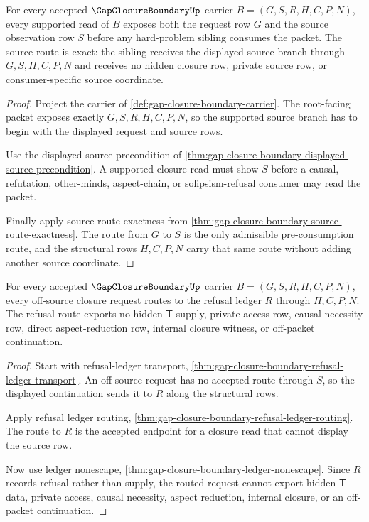 \begin{theorem}
\label{thm:gap-closure-boundary-source-observation-totality}
For every accepted $\GapClosureBoundaryUp$ carrier $B=(G,S,R,H,C,P,N)$, every supported read of $B$ exposes both the request row $G$ and the source observation row $S$ before any hard-problem sibling consumes the packet. The source route is exact: the sibling receives the displayed source branch through $G,S,H,C,P,N$ and receives no hidden closure row, private source row, or consumer-specific source coordinate.
\end{theorem}
\begin{proof}
Project the carrier of \autoref{def:gap-closure-boundary-carrier}. The root-facing packet exposes exactly $G,S,R,H,C,P,N$, so the supported source branch has to begin with the displayed request and source rows.

Use the displayed-source precondition of \autoref{thm:gap-closure-boundary-displayed-source-precondition}. A supported closure read must show $S$ before a causal, refutation, other-minds, aspect-chain, or solipsism-refusal consumer may read the packet.

Finally apply source route exactness from \autoref{thm:gap-closure-boundary-source-route-exactness}. The route from $G$ to $S$ is the only admissible pre-consumption route, and the structural rows $H,C,P,N$ carry that same route without adding another source coordinate.
\end{proof}

\begin{theorem}
\label{thm:gap-closure-boundary-refusal-ledger-totality}
For every accepted $\GapClosureBoundaryUp$ carrier $B=(G,S,R,H,C,P,N)$, every off-source closure request routes to the refusal ledger $R$ through $H,C,P,N$. The refusal route exports no hidden $\mathsf{T}$ supply, private access row, causal-necessity row, direct aspect-reduction row, internal closure witness, or off-packet continuation.
\end{theorem}
\begin{proof}
Start with refusal-ledger transport, \autoref{thm:gap-closure-boundary-refusal-ledger-transport}. An off-source request has no accepted route through $S$, so the displayed continuation sends it to $R$ along the structural rows.

Apply refusal ledger routing, \autoref{thm:gap-closure-boundary-refusal-ledger-routing}. The route to $R$ is the accepted endpoint for a closure read that cannot display the source row.

Now use ledger nonescape, \autoref{thm:gap-closure-boundary-ledger-nonescape}. Since $R$ records refusal rather than supply, the routed request cannot export hidden $\mathsf{T}$ data, private access, causal necessity, aspect reduction, internal closure, or an off-packet continuation.
\end{proof}

